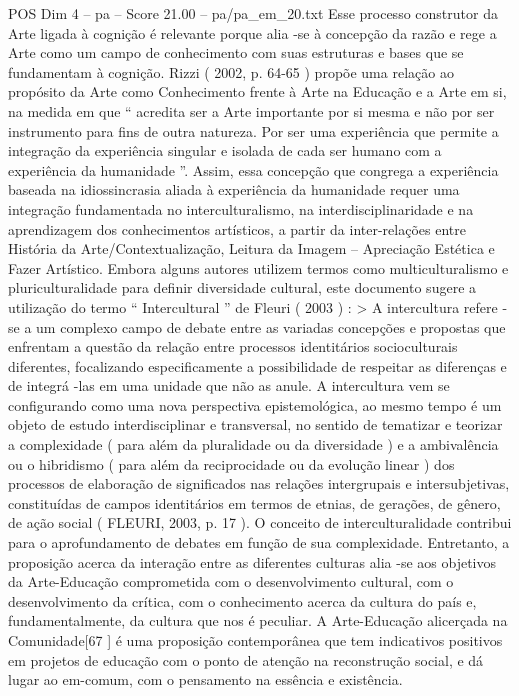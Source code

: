 \begin{textsample}{POS Dim 4 – pa – Score 21.00 – pa/pa\_em\_20.txt}
Esse processo construtor da Arte ligada à cognição é relevante porque alia -se à concepção da razão e rege a Arte como um campo de conhecimento com suas estruturas e bases que se fundamentam à cognição.
Rizzi ( 2002, p. 64-65 ) propõe uma relação ao propósito da Arte como Conhecimento frente à Arte na Educação e a Arte em si, na medida em que “ acredita ser a Arte importante por si mesma e não por ser instrumento para fins de outra natureza.
Por ser uma experiência que permite a integração da experiência singular e isolada de cada ser humano com a experiência da humanidade ”.
Assim, essa concepção que congrega a experiência baseada na idiossincrasia aliada à experiência da humanidade requer uma integração fundamentada no interculturalismo, na interdisciplinaridade e na aprendizagem dos conhecimentos artísticos, a partir da inter-relações entre História da Arte/Contextualização, Leitura da Imagem – Apreciação Estética e Fazer Artístico.
Embora alguns autores utilizem termos como multiculturalismo e pluriculturalidade para definir diversidade cultural, este documento sugere a utilização do termo “ Intercultural ” de Fleuri ( 2003 ) : > A intercultura refere -se a um complexo campo de debate entre as variadas concepções e propostas que enfrentam a questão da relação entre processos identitários socioculturais diferentes, focalizando especificamente a possibilidade de respeitar as diferenças e de integrá -las em uma unidade que não as anule.
A intercultura vem se configurando como uma nova perspectiva epistemológica, ao mesmo tempo é um objeto de estudo interdisciplinar e transversal, no sentido de tematizar e teorizar a complexidade ( para além da pluralidade ou da diversidade ) e a ambivalência ou o hibridismo ( para além da reciprocidade ou da evolução linear ) dos processos de elaboração de significados nas relações intergrupais e intersubjetivas, constituídas de campos identitários em termos de etnias, de gerações, de gênero, de ação social ( FLEURI, 2003, p. 17 ).
O conceito de interculturalidade contribui para o aprofundamento de debates em função de sua complexidade.
Entretanto, a proposição acerca da interação entre as diferentes culturas alia -se aos objetivos da Arte-Educação comprometida com o desenvolvimento cultural, com o desenvolvimento da crítica, com o conhecimento acerca da cultura do país e, fundamentalmente, da cultura que nos é peculiar.
A Arte-Educação alicerçada na Comunidade[67 ] é uma proposição contemporânea que tem indicativos positivos em projetos de educação com o ponto de atenção na reconstrução social, e dá lugar ao em-comum, com o pensamento na essência e existência.

\end{textsample}
